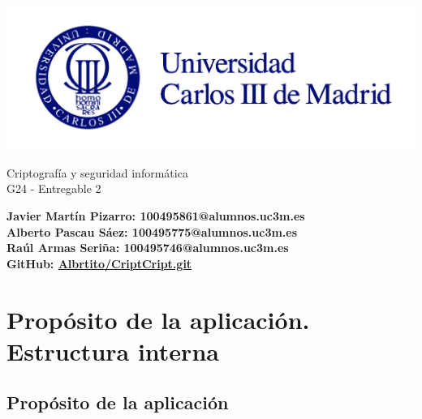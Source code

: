 \documentclass[a4paper,11pt]{article}
\begin{document}
\begin{titlepage}
    \begin{center}
        \vspace*{1cm} 
        \includegraphics[width=1\textwidth]{./images/uc3m.jpg}
        
        \vspace*{3cm} 
        
        {\LARGE Criptografía y seguridad informática\\[0.5cm]} 
        {\LARGE G24 - Entregable 2 \\[0.5cm]}
        
        \vspace*{6cm}
        
        \textbf{Javier Martín Pizarro: 100495861@alumnos.uc3m.es} \\[0.5cm]
        \textbf{Alberto Pascau Sáez: 100495775@alumnos.uc3m.es} \\[0.5cm]
        \textbf{Raúl Armas Seriña: 100495746@alumnos.uc3m.es} \\[0.5cm]
        
        \vspace*{3cm}
        \textbf{GitHub:
        \href{https://github.com/Albrtito/CriptCript.git}{Albrtito/CriptCript.git}}\\[0.5cm]

    \end{center}
\end{titlepage}

\tableofcontents
\vspace{2cm}


\section{Propósito de la aplicación. Estructura interna}

\subsection{Propósito de la aplicación}
\end{document}
